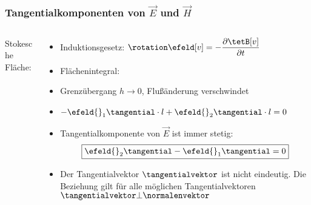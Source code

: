  \begin{frame}
  \frametitle{Tangentialkomponenten von $\vec{E}$ und $\vec{H}$}
\begin{columns}
  \begin{column}{0.4\textwidth}
    Stokesche Fläche:\\[2em]

    
	\resizebox{.7\columnwidth}{!}{}

    \end{column}
    \begin{column}{0.6\textwidth}
      \begin{itemize}
        \item<1-> Induktionsgesetz: $	\rotation \efeld[v] = -\dfrac{\partial \tetB[v]}{\partial t}$
          \item<2-> Flächenintegral: 
          \item<4-> Grenzübergang $h\to0$, Flußänderung verschwindet
            \item<5-> $-\efeld{}_1\tangential \cdot l + \efeld{}_2\tangential \cdot l = 0$
          \item<6-> \alert{Tangentialkomponente von $\vec{E}$ ist immer stetig:} 
            $$		\boxed{\efeld{}_2\tangential - \efeld{}_1\tangential = 0} $$
          \item<7-> Der Tangentialvektor $\tangentialvektor$ ist nicht
            eindeutig. Die Beziehung gilt für alle möglichen
            Tangentialvektoren $	\tangentialvektor \bot \normalenvektor $
        \end{itemize}
    \end{column}
\end{columns}
 \end{frame}

